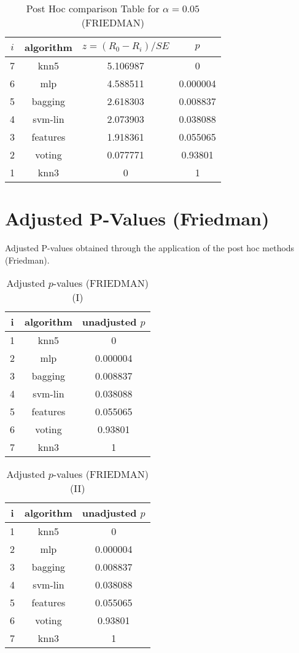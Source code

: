 \documentclass[a4paper,10pt]{article}
\begin{document}
\begin{landscape}
\begin{table}[!htp]
\centering\footnotesize
\begin{tabular}{cccc}
$i$&algorithm&$z=(R_0 - R_i)/SE$&$p$\\
\hline7&knn5&5.106987&0\\6&mlp&4.588511&0.000004\\5&bagging&2.618303&0.008837\\4&svm-lin&2.073903&0.038088\\3&features&1.918361&0.055065\\2&voting&0.077771&0.93801\\1&knn3&0&1\\\hline
\end{tabular}
\caption{Post Hoc comparison Table for $\alpha=0.05$ (FRIEDMAN)}
\end{table}
\newpage

\section{Adjusted P-Values (Friedman)}


Adjusted P-values obtained through the application of the post hoc methods (Friedman).

\begin{table}[!htp]
\centering\small
\begin{tabular}{ccc}
i&algorithm&unadjusted $p$\\
\hline1&knn5&0\\2&mlp&0.000004\\3&bagging&0.008837\\4&svm-lin&0.038088\\5&features&0.055065\\6&voting&0.93801\\7&knn3&1\\\hline
\end{tabular}
\caption{Adjusted $p$-values (FRIEDMAN) (I)}
\end{table}
\begin{table}[!htp]
\centering\small
\begin{tabular}{ccc}
i&algorithm&unadjusted $p$\\
\hline1&knn5&0\\2&mlp&0.000004\\3&bagging&0.008837\\4&svm-lin&0.038088\\5&features&0.055065\\6&voting&0.93801\\7&knn3&1\\\hline
\end{tabular}
\caption{Adjusted $p$-values (FRIEDMAN) (II)}
\end{table}

\newpage
\end{landscape}
\end{document}

